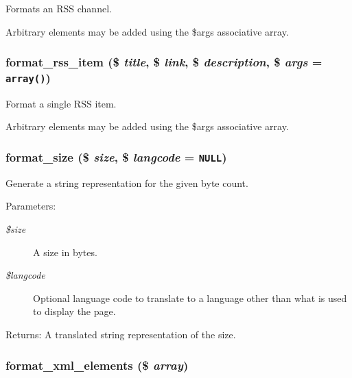 Formats an RSS channel.

Arbitrary elements may be added using the \$args associative array. \hypertarget{group__format_g4ecc9b876a9eaa65abb24ef513b217ad}{
\subsubsection[{format\_\-rss\_\-item}]{\setlength{\rightskip}{0pt plus 5cm}format\_\-rss\_\-item (\$ {\em title}, \/  \$ {\em link}, \/  \$ {\em description}, \/  \$ {\em args} = {\tt array()})}}
\label{group__format_g4ecc9b876a9eaa65abb24ef513b217ad}


Format a single RSS item.

Arbitrary elements may be added using the \$args associative array. \hypertarget{group__format_g2a0075e7646fa2f399286272faa2956e}{
\subsubsection[{format\_\-size}]{\setlength{\rightskip}{0pt plus 5cm}format\_\-size (\$ {\em size}, \/  \$ {\em langcode} = {\tt NULL})}}
\label{group__format_g2a0075e7646fa2f399286272faa2956e}


Generate a string representation for the given byte count.

\begin{Desc}
\item[Parameters:]
\begin{description}
\item[{\em \$size}]A size in bytes. \item[{\em \$langcode}]Optional language code to translate to a language other than what is used to display the page. \end{description}
\end{Desc}
\begin{Desc}
\item[Returns:]A translated string representation of the size. \end{Desc}
\hypertarget{group__format_gfb344c648e6b63c35950d2889430e4c7}{
\subsubsection[{format\_\-xml\_\-elements}]{\setlength{\rightskip}{0pt plus 5cm}format\_\-xml\_\-elements (\$ {\em array})}}
\label{group__format_gfb344c648e6b63c35950d2889430e4c7}


